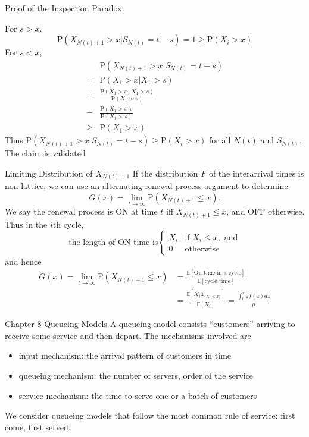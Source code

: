 \documentclass[letterpaper,handout, mathserif]{beamer}
\def\p{\mathrm P}
\def\E{\mathbb E}
\begin{document}
\begin{frame}{Proof of the Inspection Paradox}

For $s>x$,
$$\p(X_{N(t)+1}>x|S_{N(t)}=t-s) = 1\ge \p(X_{i}>x)$$
For $s<x$,
\begin{align*}
&\p(X_{N(t)+1}>x|S_{N(t)}=t-s)\\
={}&\p(X_{1}>x|X_{1}> s)\\
={}&\frac{\p(X_{1}>x,\,X_{1}> s)}{\p(X_{1}> s)}\\
={}&\frac{\p(X_{1}>x)}{\p(X_{1}> s)}\\
\ge{}&\p(X_{1}>x)
\end{align*}
Thus $\p(X_{N(t)+1}>x|S_{N(t)}=t-s)\ge \p(X_{i}>x)$ for all $N(t)$ and $S_{N(t)}$.
The claim is validated
\end{frame}
\begin{frame}{Limiting Distribution of $X_{N(t)+1}$}
If the distribution $F$ of the interarrival times is non-lattice,
we can use an alternating renewal process argument to determine
$$G(x)=\lim_{t\to\infty}\p(X_{N(t)+1}\le x).$$
We say the renewal process is ON at time $t$ iff $X_{N(t)+1}\le x$, and OFF otherwise.
Thus in the $i$th cycle,
$$\mbox{the length of ON time is}
\begin{cases}
X_i & \mbox{if }X_i\le x,\mbox{ and}\\
0 &\mbox{otherwise}
\end{cases}
$$
and hence
\begin{align*}
G(x)=\lim_{t\to\infty}\p(X_{N(t)+1}\le x)&=\frac{\E[\mbox{On time in a cycle}]}{\E[\mbox{cycle time}]}\\
&=\frac{\E[X_i\mathbf{1}_{\{X_i\le x\}}]}{\E[X_i]}=\frac{\int_{0}^{x} z f(z)dz}{\mu}
\end{align*}
\end{frame}
\begin{frame}{Chapter 8\; Queueing Models}
A queueing model consists ``customers'' arriving to receive some service and then depart. The mechanisms involved are
\begin{itemize}
\item input mechanism: the arrival pattern of customers in time
\item queueing mechanism: the number of servers, order of the service
\item service mechanism: the time to serve one or a batch of customers
\end{itemize}
We consider queueing models that follow the most common rule of service: first come, first served.
\end{frame}
\end{document}
